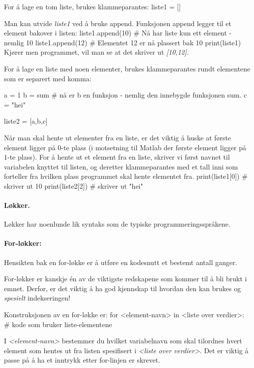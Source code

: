 \documentclass[%
oneside,                 %
final,                   %
10pt]{article}
\begin{document}
For å lage en tom liste, brukes klammeparantes:
\bpycod
liste1 = []
\epycod

Man kan utvide \emph{liste1} ved å bruke append. Funksjonen append legger til et element bakover i listen:
\bpycod
liste1.append(10) # Nå har liste kun ett element - nemlig 10
liste1.append(12) # Elementet 12 er nå plassert bak 10
print(liste1)
\epycod
Kjører men programmet, vil man se at det skriver ut \emph{[10,12]}.


For å lage en liste med noen elementer, brukes klammeparantes rundt elementene som er separert med komma:

\bpycod
a = 1
b = sum # nå er b en funksjon - nemlig den innebygde funksjonen sum.
c = "hei"

liste2 = [a,b,c]
\epycod

Når man skal hente ut elementer fra en liste, er det viktig å huske at første element ligger på 0-te plass (i motsetning til Matlab der første element ligger på 1-te plass).
For å hente ut et element fra en liste, skriver vi først navnet til variabelen knyttet til listen, og deretter klammeparantes med et tall inni som forteller fra hvilken plass programmet skal hente elementet fra.
\bpycod
print(liste1[0]) # skriver ut 10
print(liste2[2]) # skriver ut "hei"
\epycod

\paragraph{Løkker.}
Løkker har noenlunde lik syntaks som de typiske programmeringsspråkene.

\paragraph{For-løkker:}
Hensikten bak en for-løkke er å utføre en kodesnutt et bestemt antall ganger.

For-løkker er kanskje én av de viktigste redskapene som kommer til å bli brukt i emnet.
Derfor, er det viktig å ha god kjennskap til hvordan den kan brukes og \emph{spesielt} indekseringen!

Konstruksjonen av en for-løkke er:
\bpycod
for <element-navn> in <liste over verdier>:
    # kode som bruker liste-elementene
\epycod

I \emph{<element-navn>} bestemmer du hvilket variabelnavn som skal tilordnes hvert element som hentes ut fra listen spesifisert i \emph{<liste over verdier>}.
Det er viktig å passe på å ha et inntrykk etter for-linjen er skrevet.
\end{document}
